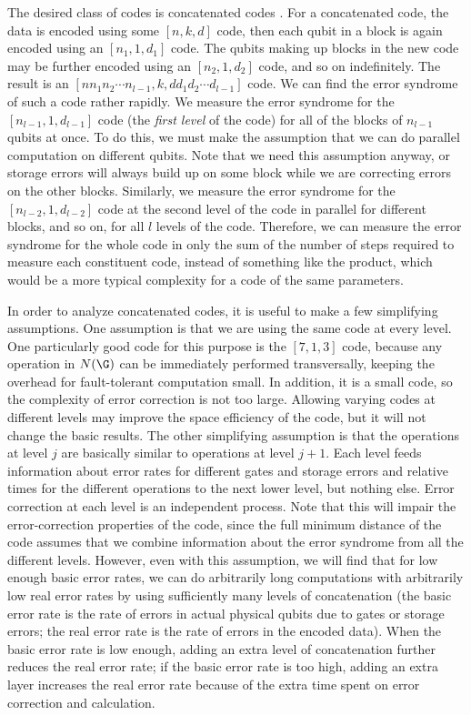 The desired class of codes is concatenated codes
\cite{aharonov,knill-concatenate2,knill-concatenate1,zalka}.  For a
concatenated code, the data is encoded using some $[n, k, d]$ code, then
each qubit in a block is again encoded using an $[n_1, 1, d_1]$ code.  The
qubits making up blocks in the new code may be further encoded using an
$[n_2, 1, d_2]$ code, and so on indefinitely.  The result is an $[n n_1 n_2
\cdots n_{l-1}, k, d d_1 d_2 \cdots d_{l-1}]$ code.  We can find the error
syndrome of such a code rather rapidly.  We measure the error syndrome
for the $[n_{l-1}, 1, d_{l-1}]$ code (the {\em first level} of the code) for
all of the blocks of $n_{l-1}$ qubits at once.  To do this, we must make the
assumption that we can do parallel computation on different qubits.  Note
that we need this assumption anyway, or storage errors will always build
up on some block while we are correcting errors on the other blocks.
Similarly, we measure the error syndrome for the $[n_{l-2}, 1, d_{l-2}]$
code at the second level of the code in parallel for different blocks, and so
on, for all $l$ levels of the code.  Therefore, we can measure the error
syndrome for the whole code in only the sum of the number of steps
required to measure each constituent code, instead of something like the
product, which would be a more typical complexity for a code of the same
parameters.

In order to analyze concatenated codes, it is useful to make a few
simplifying assumptions.  One assumption is that we are using the same
code at every level.  One particularly good code for this purpose is the
$[7,1,3]$ code, because any operation in $N(\G)$ can be immediately
performed transversally, keeping the overhead for fault-tolerant
computation small.  In addition, it is a small code, so the complexity of
error correction is not too large.  Allowing varying codes at different levels
may improve the space efficiency of the code, but it will not change the
basic results.  The other simplifying assumption is that the operations at
level $j$ are basically similar to operations at level $j+1$.  Each level feeds
information about error rates for different gates and storage errors and
relative times for the different operations to the next lower level, but
nothing else.  Error correction at each level is an independent process.
Note that this will impair the error-correction properties of the code, since
the full minimum distance of the code assumes that we combine
information about the error syndrome from all the different levels.
However, even with this assumption, we will find that for low enough basic
error rates, we can do arbitrarily long computations with arbitrarily low
real error rates by using sufficiently many levels of concatenation (the
basic error rate is the rate of errors in actual physical qubits due to gates
or storage errors; the real error rate is the rate of errors in the encoded
data).  When the basic error rate is low enough, adding an extra level of
concatenation further reduces the real error rate; if the basic error rate
is too high, adding an extra layer increases the real error rate because of
the extra time spent on error correction and calculation.

